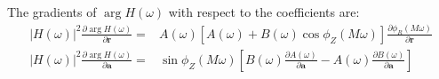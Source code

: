 \documentclass[a4paper,twoside,10pt,english]{report}
\begin{document}
The gradients of $\arg H\left(\omega\right)$ with respect to the 
coefficients are:
\begin{align*}
\left|H\left(\omega\right)\right|^{2}
\frac{\partial \arg H\left(\omega\right)}{\partial\boldsymbol{r}}=&
A\left(\omega\right)\left[A\left(\omega\right)+
 B\left(\omega\right)\cos\phi_{Z}\left(M\omega\right)\right]
\frac{\partial \phi_{R}\left(M\omega\right)}{\partial\boldsymbol{r}} \\
\left|H\left(\omega\right)\right|^{2}
\frac{\partial \arg H\left(\omega\right)}{\partial\boldsymbol{a}}=&
\sin\phi_{Z}\left(M\omega\right)\left[
B\left(\omega\right)\frac{\partial A\left(\omega\right)}{\partial\boldsymbol{a}}-
A\left(\omega\right)\frac{\partial B\left(\omega\right)}{\partial\boldsymbol{a}}
\right]
\end{align*}
\end{document}
